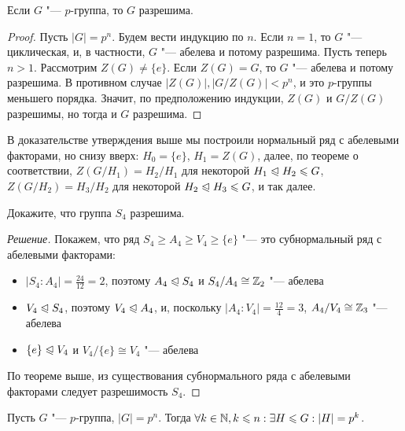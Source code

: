 \begin{proposition}
	Если $G$ "--- $p$-группа, то $G$ разрешима.
\end{proposition}

\begin{proof}
	Пусть $|G| = p^n$. Будем вести индукцию по $n$. Если $n = 1$, то $G$ "--- циклическая, и, в частности, $G$ "--- абелева и потому разрешима. Пусть теперь $n > 1$. Рассмотрим $Z(G) \ne \{e\}$. Если $Z(G) = G$, то $G$ "--- абелева и потому разрешима. В противном случае $|Z(G)|, |G/Z(G)| < p^n$, и это $p$-группы меньшего порядка. Значит, по предположению индукции, $Z(G)$ и $G/Z(G)$ разрешимы, но тогда и $G$ разрешима.
\end{proof}

\begin{note}
	В доказательстве утверждения выше мы построили нормальный ряд с абелевыми факторами, но снизу вверх: $H_0 = \{e\}$, $H_1 = Z(G)$, далее, по теореме о соответствии, $Z(G/H_1) = H_2/H_1$ для некоторой $H_1 \trianglelefteqslant H_2 \leqslant G$, $Z(G/H_2) = H_3/H_2$ для некоторой $H_2 \trianglelefteqslant H_3 \leqslant G$, и так далее.
\end{note}

\begin{exercise}
	Докажите, что группа $S_4$ разрешима.
\end{exercise}

\begin{proof}[Решение]
	Покажем, что ряд $S_4 \ge A_4 \ge V_4 \ge \{e\}$ "--- это субнормальный ряд с абелевыми факторами:
	\begin{itemize}
		\item $|S_4 : A_4| = \frac{24}{12} = 2$, поэтому $A_4 \trianglelefteqslant S_4$ и $S_4/A_4 \cong \mathbb{Z}_2$ "--- абелева
		\item $V_4 \trianglelefteqslant S_4$, поэтому $V_4 \trianglelefteqslant A_4$, и, поскольку $|A_4 : V_4| = \frac{12}{4} = 3$, $A_4/V_4 \cong \mathbb{Z}_3$ "--- абелева
		\item $\{e\} \trianglelefteqslant V_4$ и $V_4/\{e\} \cong V_4$ "--- абелева
	\end{itemize}
	
	По теореме выше, из существования субнормального ряда с абелевыми факторами следует разрешимость $S_4$.
\end{proof}

\begin{theorem}
	Пусть $G$ "--- $p$-группа, $|G| = p^n$. Тогда $\forall k \in \mathbb{N}, k \leqslant n: \exists H \leqslant G: |H| = p^k$.
\end{theorem}

